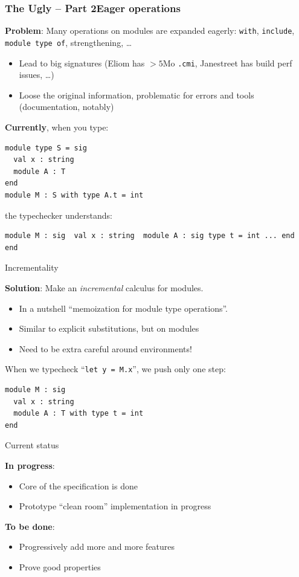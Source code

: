 \documentclass[aspectratio=169,dvipsnames,svgnames,10pt]{beamer}
\begin{document}
\begin{frame}[fragile]
  \frametitle{The Ugly -- Part 2\hfill Eager operations}

  \textbf{Problem}: Many operations on modules are expanded eagerly: \texttt{with}, \texttt{include}, \texttt{module type of}, strengthening, \dots
  \begin{itemize}
  \item Lead to big signatures (Eliom has $>5$Mo {\tt .cmi}, Janestreet has build perf issues, \dots)
  \item Loose the original information, problematic for errors and tools (documentation, notably)
  \end{itemize}

  \pause
  \textbf{Currently}, when you type:
\begin{verbatim}
module type S = sig 
  val x : string
  module A : T
end
module M : S with type A.t = int
\end{verbatim}

  the typechecker understands:
\begin{verbatim}
module M : sig  val x : string  module A : sig type t = int ... end  end
\end{verbatim}
\end{frame}

\begin{frame}[fragile]{Incrementality}
  
  \textbf{Solution}: Make an \emph{incremental} calculus for modules.
  \begin{itemize}
  \item In a nutshell ``memoization for module type operations''.
  \item Similar to explicit substitutions, but on modules
  \item Need to be extra careful around environments!
  \end{itemize}

  When we typecheck ``\texttt{let y = M.x}'', we push only one step:
\begin{verbatim}
module M : sig
  val x : string
  module A : T with type t = int
end
\end{verbatim}
\end{frame}

\begin{frame}{Current status}

  {\bf In progress}:
  \begin{itemize}
  \item Core of the specification is done
  \item Prototype ``clean room'' implementation in progress
  \end{itemize}

  {\bf To be done}:
  \begin{itemize}
  \item Progressively add more and more features
  \item Prove good properties
  \end{itemize}
\end{frame}
\end{document}
